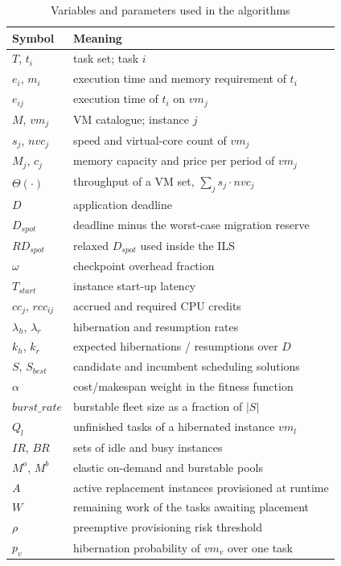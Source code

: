 \documentclass[conference]{IEEEtran}
\begin{document}
\begin{table}[t]
\caption{Variables and parameters used in the algorithms}
\label{tab:vars}
\centering
\footnotesize
\begin{tabular}{ll}
\toprule
Symbol & Meaning \\
\midrule
$T$, $t_i$ & task set; task $i$ \\
$e_i$, $m_i$ & execution time and memory requirement of $t_i$ \\
$e_{ij}$ & execution time of $t_i$ on $vm_j$ \\
$M$, $vm_j$ & VM catalogue; instance $j$ \\
$s_j$, $\mathit{nvc}_j$ & speed and virtual-core count of $vm_j$ \\
$M_j$, $c_j$ & memory capacity and price per period of $vm_j$ \\
$\Theta(\cdot)$ & throughput of a VM set, $\sum_j s_j\!\cdot\!\mathit{nvc}_j$ \\
$D$ & application deadline \\
$D_{\mathit{spot}}$ & deadline minus the worst-case migration reserve \\
$\mathit{RD}_{\mathit{spot}}$ & relaxed $D_{\mathit{spot}}$ used inside the ILS \\
$\omega$ & checkpoint overhead fraction \\
$T_{\mathit{start}}$ & instance start-up latency \\
$\mathit{cc}_j$, $\mathit{rcc}_{ij}$ & accrued and required CPU credits \\
$\lambda_h$, $\lambda_r$ & hibernation and resumption rates \\
$k_h$, $k_r$ & expected hibernations / resumptions over $D$ \\
$S$, $S_{\mathit{best}}$ & candidate and incumbent scheduling solutions \\
$\alpha$ & cost/makespan weight in the fitness function \\
$\mathit{burst\_rate}$ & burstable fleet size as a fraction of $|S|$ \\
$Q_l$ & unfinished tasks of a hibernated instance $vm_l$ \\
$\mathit{IR}$, $\mathit{BR}$ & sets of idle and busy instances \\
$M^{o}$, $M^{b}$ & elastic on-demand and burstable pools \\
$A$ & active replacement instances provisioned at runtime \\
$W$ & remaining work of the tasks awaiting placement \\
$\rho$ & preemptive provisioning risk threshold \\
$p_v$ & hibernation probability of $vm_v$ over one task \\
\bottomrule
\end{tabular}
\end{table}
\end{document}
